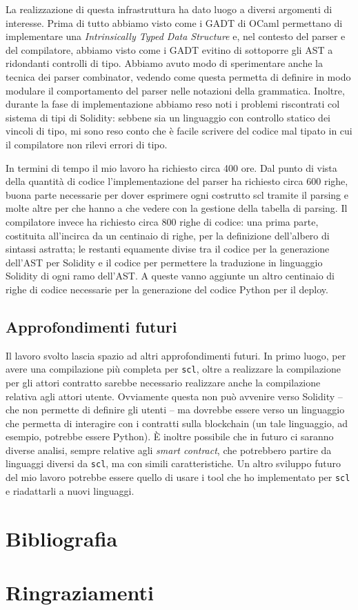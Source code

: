 \documentclass[12pt,a4paper]{report}
\begin{document}
La realizzazione di questa infrastruttura ha dato luogo a diversi
argomenti di interesse. Prima di tutto abbiamo visto come i GADT di
OCaml permettano di implementare una \emph{Intrinsically Typed Data
Structure} e, nel contesto del parser e del compilatore, abbiamo visto
come i GADT evitino di sottoporre gli AST a ridondanti controlli di
tipo. Abbiamo avuto modo di sperimentare anche la tecnica dei parser
combinator, vedendo come questa permetta di definire in modo modulare il
comportamento del parser nelle notazioni della grammatica. Inoltre,
durante la fase di implementazione abbiamo reso noti i problemi
riscontrati col sistema di tipi di Solidity: sebbene sia un linguaggio
con controllo statico dei vincoli di tipo, mi sono reso conto che è
facile scrivere del codice mal tipato in cui il compilatore non rilevi
errori di tipo.

In termini di tempo il mio lavoro ha richiesto circa 400 ore. Dal punto
di vista della quantità di codice l'implementazione del parser ha
richiesto circa 600 righe, buona parte necessarie per dover esprimere
ogni costrutto scl tramite il parsing e molte altre per che hanno a che
vedere con la gestione della tabella di parsing. Il compilatore invece
ha richiesto circa 800 righe di codice: una prima parte, costituita
all'incirca da un centinaio di righe, per la definizione dell'albero di
sintassi astratta; le restanti equamente divise tra il codice per la
generazione dell'AST per Solidity e il codice per permettere la
traduzione in linguaggio Solidity di ogni ramo dell'AST. A queste vanno
aggiunte un altro centinaio di righe di codice necessarie per la
generazione del codice Python per il deploy.

\hypertarget{approfondimenti-futuri}{%
\section{Approfondimenti futuri}\label{approfondimenti-futuri}}

Il lavoro svolto lascia spazio ad altri approfondimenti futuri. In primo
luogo, per avere una compilazione più completa per \texttt{scl}, oltre a
realizzare la compilazione per gli attori contratto sarebbe necessario
realizzare anche la compilazione relativa agli attori utente. Ovviamente
questa non può avvenire verso Solidity -- che non permette di definire
gli utenti -- ma dovrebbe essere verso un linguaggio che permetta di
interagire con i contratti sulla blockchain (un tale linguaggio, ad
esempio, potrebbe essere Python). È inoltre possibile che in futuro ci
saranno diverse analisi, sempre relative agli \emph{smart contract}, che
potrebbero partire da linguaggi diversi da \texttt{scl}, ma con simili
caratteristiche. Un altro sviluppo futuro del mio lavoro potrebbe essere
quello di usare i tool che ho implementato per \texttt{scl} e
riadattarli a nuovi linguaggi.

\hypertarget{bibliografia}{%
\chapter{Bibliografia}\label{bibliografia}}

\hypertarget{ringraziamenti}{%
\chapter{Ringraziamenti}\label{ringraziamenti}}
\end{document}
